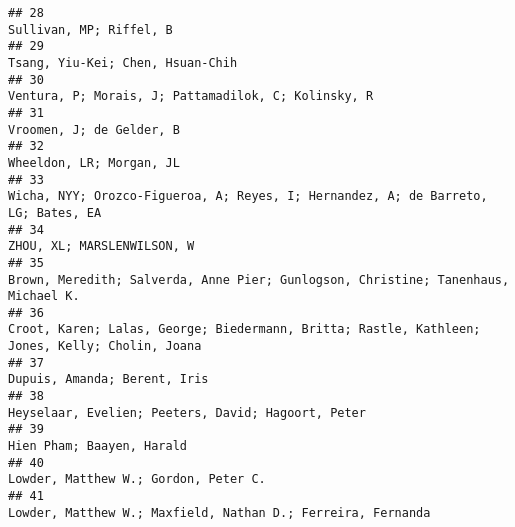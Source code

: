 \documentclass[
  english,
  man]{apa6}
\begin{document}
\begin{verbatim}
## 28                                                                                                                                                                   Sullivan, MP; Riffel, B
## 29                                                                                                                                                          Tsang, Yiu-Kei; Chen, Hsuan-Chih
## 30                                                                                                                                       Ventura, P; Morais, J; Pattamadilok, C; Kolinsky, R
## 31                                                                                                                                                                  Vroomen, J; de Gelder, B
## 32                                                                                                                                                                  Wheeldon, LR; Morgan, JL
## 33                                                                                                         Wicha, NYY; Orozco-Figueroa, A; Reyes, I; Hernandez, A; de Barreto, LG; Bates, EA
## 34                                                                                                                                                                ZHOU, XL; MARSLENWILSON, W
## 35                                                                                                         Brown, Meredith; Salverda, Anne Pier; Gunlogson, Christine; Tanenhaus, Michael K.
## 36                                                                                            Croot, Karen; Lalas, George; Biedermann, Britta; Rastle, Kathleen; Jones, Kelly; Cholin, Joana
## 37                                                                                                                                                              Dupuis, Amanda; Berent, Iris
## 38                                                                                                                                        Heyselaar, Evelien; Peeters, David; Hagoort, Peter
## 39                                                                                                                                                                 Hien Pham; Baayen, Harald
## 40                                                                                                                                                      Lowder, Matthew W.; Gordon, Peter C.
## 41                                                                                                                               Lowder, Matthew W.; Maxfield, Nathan D.; Ferreira, Fernanda

\end{verbatim}
\end{document}
